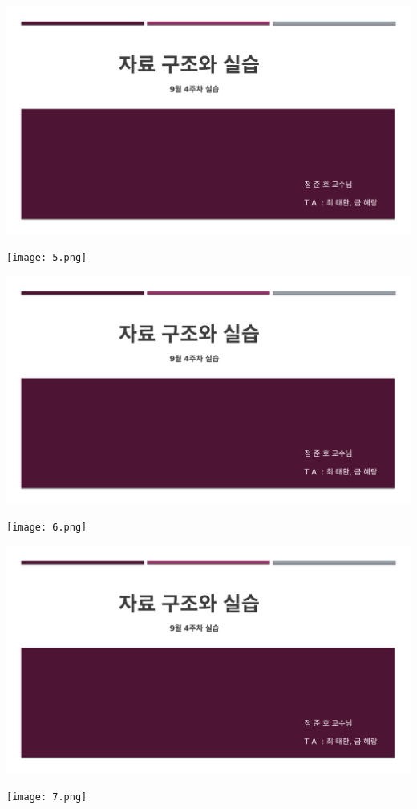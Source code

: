 \documentclass[11pt,a4paper]{article}
\begin{document}
\newpage
\includegraphics[page=3, width=\textwidth]{1.pdf}
\newpage
	
\texttt{[image: 5.png]}	


\newpage
\includegraphics[page=4, width=\textwidth]{1.pdf}
\newpage
	
\texttt{[image: 6.png]}	


\newpage
\includegraphics[page=5, width=\textwidth]{1.pdf}
\newpage
	
\texttt{[image: 7.png]}	
\end{document}
